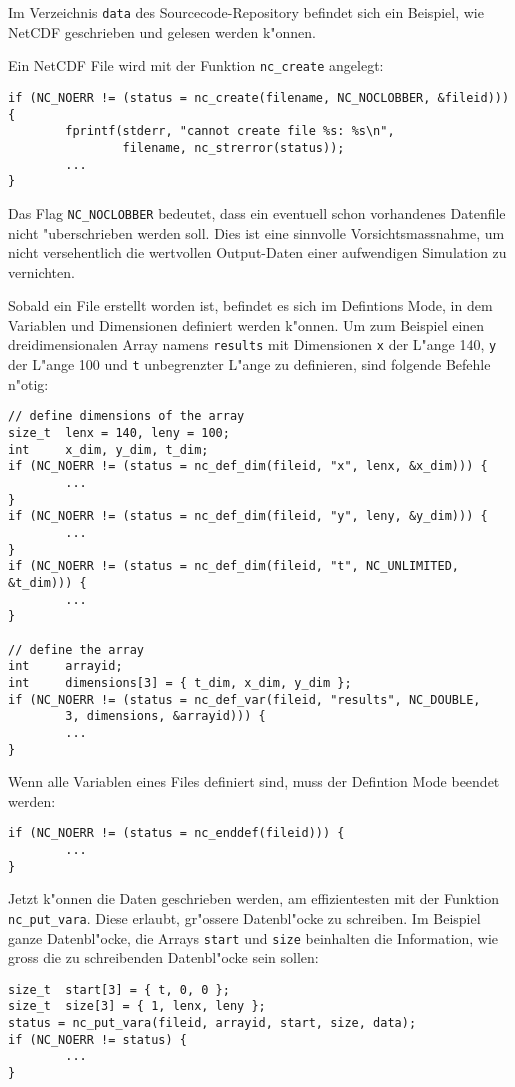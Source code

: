 \begin{beispiel}
Im Verzeichnis {\tt data} des Sourcecode-Repository befindet sich
ein Beispiel, wie NetCDF geschrieben und gelesen werden k"onnen.

Ein NetCDF File wird mit der Funktion \verb+nc_create+ angelegt:
\begin{verbatim}
if (NC_NOERR != (status = nc_create(filename, NC_NOCLOBBER, &fileid))) {
        fprintf(stderr, "cannot create file %s: %s\n",
                filename, nc_strerror(status));
        ...
}
\end{verbatim}
Das Flag \verb+NC_NOCLOBBER+ bedeutet, dass ein eventuell schon vorhandenes
Datenfile nicht "uberschrieben werden soll.
Dies ist eine sinnvolle Vorsichtsmassnahme, um nicht versehentlich
die wertvollen Output-Daten einer aufwendigen Simulation zu vernichten.

Sobald ein File erstellt worden ist, befindet es sich im Defintions
Mode, in dem Variablen und Dimensionen definiert werden k"onnen.
Um zum Beispiel einen dreidimensionalen Array namens {\tt results}
mit Dimensionen {\tt x} der L"ange 140, {\tt y} der L"ange 100 und 
{\tt t} unbegrenzter L"ange zu definieren, sind folgende Befehle n"otig:
\begin{verbatim}
// define dimensions of the array
size_t  lenx = 140, leny = 100;
int     x_dim, y_dim, t_dim;
if (NC_NOERR != (status = nc_def_dim(fileid, "x", lenx, &x_dim))) {
        ...
}
if (NC_NOERR != (status = nc_def_dim(fileid, "y", leny, &y_dim))) {
        ...
}
if (NC_NOERR != (status = nc_def_dim(fileid, "t", NC_UNLIMITED, &t_dim))) {
        ...
}

// define the array
int     arrayid;
int     dimensions[3] = { t_dim, x_dim, y_dim };
if (NC_NOERR != (status = nc_def_var(fileid, "results", NC_DOUBLE,
        3, dimensions, &arrayid))) {
        ...
}
\end{verbatim}
Wenn alle Variablen eines Files definiert sind, muss der Defintion
Mode beendet werden:
\begin{verbatim}
if (NC_NOERR != (status = nc_enddef(fileid))) {
        ...
}
\end{verbatim}
Jetzt k"onnen die Daten geschrieben werden, am effizientesten mit der
Funktion \verb+nc_put_vara+. Diese erlaubt, gr"ossere Datenbl"ocke
zu schreiben.
Im Beispiel ganze Datenbl"ocke, die Arrays {\tt start} und {\tt size}
beinhalten die Information, wie gross die zu schreibenden Datenbl"ocke
sein sollen:
\begin{verbatim}
size_t  start[3] = { t, 0, 0 };
size_t  size[3] = { 1, lenx, leny };
status = nc_put_vara(fileid, arrayid, start, size, data);
if (NC_NOERR != status) {
        ...
}
\end{verbatim}
\end{beispiel}

